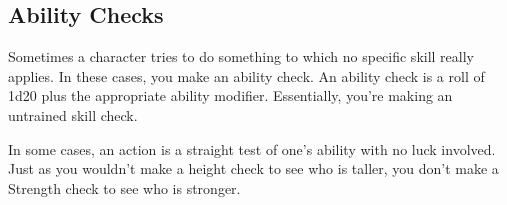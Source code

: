 \subsection{Ability Checks}
Sometimes a character tries to do something to which no specific skill really applies. In these cases, you make an ability check. An ability check is a roll of 1d20 plus the appropriate ability modifier. Essentially, you're making an untrained skill check.

In some cases, an action is a straight test of one's ability with no luck involved. Just as you wouldn't make a height check to see who is taller, you don't make a Strength check to see who is stronger.